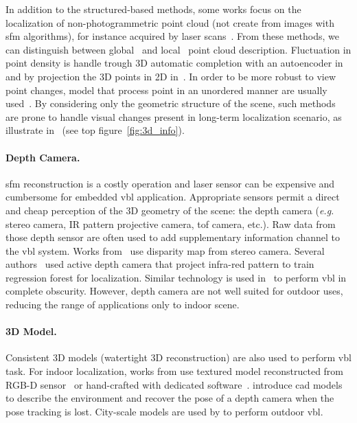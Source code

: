 			In addition to the structured-based methods, some works focus on the localization of non-photogrammetric point cloud (\ie not create from images with \ac{sfm} algorithms), for instance acquired by laser scans~\citep{Elbaz2017,Uy2018,Schonberger2017a,Zeng2016,Yew2018,Deng2018}. From these methods, we can distinguish between global~\citep{Uy2018,Schonberger2017a} and local~\citep{Elbaz2017,Zeng2016,Yew2018,Deng2018} point cloud description. Fluctuation in point density is handle trough 3D automatic completion with an autoencoder in~\citep{Schonberger2017a} and by projection the 3D points in 2D in~\citep{Elbaz2017}. In order to be more robust to view point changes, model that process point in an unordered manner are usually used~\citep{Yew2018,Deng2018}. By considering only the geometric structure of the scene, such methods are prone to handle visual changes present in long-term localization scenario, as illustrate in~\citep{Schonberger2017a,Uy2018} (see top figure~\ref{fig:3d_info}).

		\paragraph{Depth Camera.}
			\Ac{sfm} reconstruction is a costly operation and laser sensor can be expensive and cumbersome for embedded \ac{vbl} application. Appropriate sensors permit a direct and cheap perception of the 3D geometry of the scene: the depth camera (\textit{e.g.} stereo camera, IR pattern projective camera, \ac{tof} camera, etc.). Raw data from those depth sensor are often used to add supplementary information channel to the \ac{vbl} system. Works from~\citep{Ni2009,McManus2014,Wan2014} use disparity map from stereo camera. Several authors~\citep{Shotton2013,Guzman-rivera2014,Glocker2015} used active depth camera that project infra-red pattern to train regression forest for localization. Similar technology is used in~\citep{Li2016a} to perform \ac{vbl} in complete obscurity. However, depth camera are not well suited for outdoor uses, reducing the range of applications only to indoor scene.

		\paragraph{3D Model.} 
			Consistent 3D models (\ie watertight 3D reconstruction) are also used to perform \ac{vbl} task.  For indoor localization, works from \citep{Shotton2013,Pascoe2015} use textured model reconstructed from RGB-D sensor~\citep{Shotton2013} or hand-crafted with dedicated software~\citep{Pascoe2015}. \citet{Salas-Moreno2013} introduce \ac{cad} models to describe the environment and recover the pose of a depth camera when the pose tracking is lost. City-scale models are used by \citep{Aubry2014,Poglitsch2015,Pascoe2015a,Pascoe2015b,Caselitz2016} to perform outdoor \ac{vbl}. 

